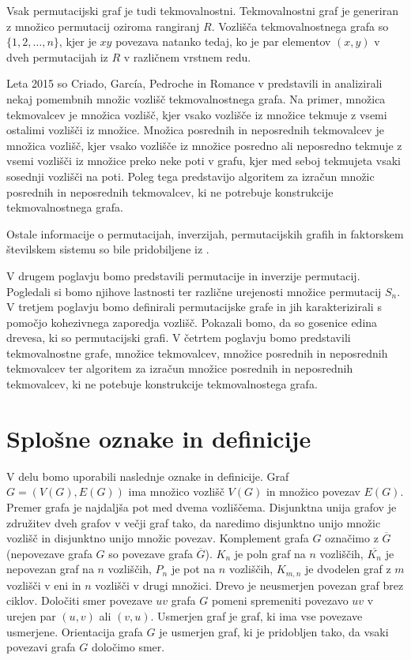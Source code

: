 \documentclass[a4paper, 12pt]{book}
\begin{document}
Vsak permutacijski graf je tudi tekmovalnostni. Tekmovalnostni graf je generiran z množico permutacij oziroma rangiranj $R$. Vozlišča tekmovalnostnega grafa so $\{ 1, 2, \dots, n \}$, kjer je $xy$ povezava natanko tedaj, ko je par elementov $(x, y)$ v dveh permutacijah iz $R$ v različnem vrstnem redu. 

Leta 2015 so Criado, García, Pedroche in Romance v \cite{setsOfRankings} predstavili in analizirali nekaj pomembnih množic vozlišč tekmovalnostnega grafa. Na primer, množica tekmovalcev je množica vozlišč, kjer vsako vozlišče iz množice tekmuje z vsemi ostalimi vozlišči iz množice. Množica posrednih in neposrednih tekmovalcev je množica vozlišč, kjer vsako vozlišče iz množice posredno ali neposredno tekmuje z vsemi vozlišči iz množice preko neke poti v grafu, kjer med seboj tekmujeta vsaki sosednji vozlišči na poti. Poleg tega predstavijo algoritem za izračun množic posrednih in neposrednih tekmovalcev, ki ne potrebuje konstrukcije tekmovalnostnega grafa.

Ostale informacije o permutacijah, inverzijah, permutacijskih grafih in faktorskem številskem sistemu so bile pridobiljene iz \cite{algorithmDesign, dsSkripta, inversionCoding, factorialNumberSystem, algorithmGraphTheoryAndPerfectGraphs}.

V drugem poglavju bomo predstavili permutacije in inverzije permutacij. Pogledali si bomo njihove lastnosti ter različne urejenosti množice permutacij $S_n$. V tretjem poglavju bomo definirali permutacijske grafe in jih karakterizirali s pomočjo kohezivnega zaporedja vozlišč. Pokazali bomo, da so gosenice edina drevesa, ki so permutacijski grafi. V četrtem poglavju bomo predstavili tekmovalnostne grafe, množice tekmovalcev, množice posrednih in neposrednih tekmovalcev ter algoritem za izračun množice posrednih in neposrednih tekmovalcev, ki ne potebuje konstrukcije tekmovalnostega grafa.

\section{ Splošne oznake in definicije }

V delu bomo uporabili naslednje oznake in definicije.
Graf $G = (V(G), E(G))$ ima množico vozlišč $V(G)$ in množico povezav $E(G)$. Premer grafa je najdaljša pot med dvema vozliščema. Disjunktna unija grafov je združitev dveh grafov v večji graf tako, da naredimo disjunktno unijo množic vozlišč in disjunktno unijo množic povezav. Komplement grafa $G$ označimo z $\overline{G}$ (nepovezave grafa $G$ so povezave grafa $\overline{G}$). $K_n$ je poln graf na $n$ vozliščih, $\overline{K_n}$ je nepovezan graf na $n$ vozliščih, $P_n$ je pot na $n$ vozliščih, $K_{m, n}$ je dvodelen graf z $m$ vozlišči v eni in $n$ vozlišči v drugi množici. Drevo je neusmerjen povezan graf brez ciklov. Določiti smer povezave $uv$ grafa $G$ pomeni spremeniti povezavo $uv$ v urejen par $(u, v)$ ali $(v, u)$. Usmerjen graf je graf, ki ima vse povezave usmerjene. Orientacija grafa $G$ je usmerjen graf, ki je pridobljen tako, da vsaki povezavi grafa $G$ določimo smer.
\end{document}
